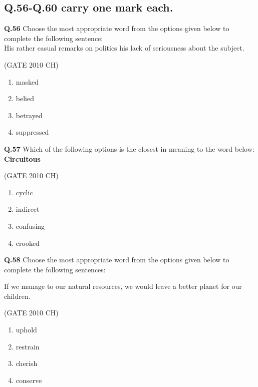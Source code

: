\documentclass[journal,12pt,onecolumn]{exam}
\theoremstyle{remark}
\begin{document}
\subsection{Q.56-Q.60 carry one mark each.}

\noindent
\textbf{Q.56}
 Choose the most appropriate word from the options given below to complete the following sentence:\\
 His rather casual remarks on politics \makebox[3cm]{\hrulefill} his lack of seriousness about the subject.
  
  \hfill{(GATE 2010 CH)}\\

  \begin{enumerate}
      \item masked
      \item belied
      \item betrayed
      \item suppressed
  \end{enumerate}

\noindent
\textbf{Q.57}
 Which of the following options is the closest in meaning to the word below:\\
     \textbf{Circuitous}
   
    \hfill{(GATE 2010 CH)}\\
 
 \begin{enumerate}
     \item cyclic
     \item indirect
     \item confusing
     \item crooked
 \end{enumerate}

\noindent
\textbf{Q.58}
 Choose the most appropriate word from the options given below to complete the following sentences:

  If we manage to \makebox[3cm]{\hrulefill} our natural resources, we would leave a better planet for our children.

\hfill{(GATE 2010 CH)}\\

\begin{enumerate}
    \item uphold
    \item restrain
    \item cherish
    \item conserve
\end{enumerate}
\end{document}
